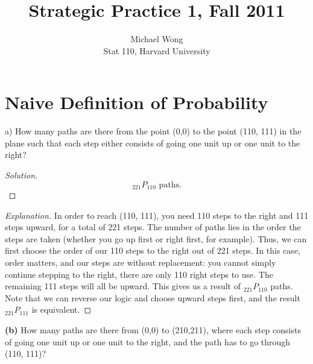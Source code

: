 \documentclass[10pt]{article}
\newenvironment{problem}[2][Problem]{\begin{trivlist}
\item[\hskip \labelsep {\bfseries #1}\hskip \labelsep {\bfseries #2.}]}{\end{trivlist}}
\begin{document}
 
\title{Strategic Practice 1, Fall 2011}
\author{Michael Wong\\
Stat 110, Harvard University}
\maketitle

\section{Naive Definition of Probability}
 


\begin{problem}{3} 
(a) How many paths are there from the point (0,0) to the point (110, 111) in the plane such that each step either consists of going one unit up or one unit to the right?
\end{problem}

\begin{question} 

\end{question}

\begin{proof}[Solution]
\[
     _{221} P_{110} \text{ paths.}
\]
\end{proof}

\begin{proof}[Explanation]

In order to reach (110, 111), you need 110 steps to the right and 111 steps upward, for a total of 221 steps. The number of paths lies in the order the steps are taken (whether you go up first or right first, for example). Thus, we can first choose the order of our 110 steps to the right out of 221 steps. In this case, order matters, and our steps are without replacement: you cannot simply continue stepping to the right, there are only 110 right steps to use. The remaining 111 steps will all be upward. This gives us a result of $_{221} P_{110}$ paths. Note that we can reverse our logic and choose upward steps first, and the result $_{221} P_{111}$ is equivalent.

\end{proof}


\begin{question} 

\textbf{(b)} How many paths are there from (0,0) to (210,211), where each step consists of going one unit up or one unit to the right, and the path has to go through (110, 111)?

\end{question}
\end{document}
